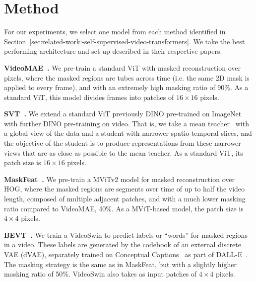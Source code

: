 \section{Method}
\label{sec:method}

For our experiments, we select one model from each method identified in Section~\ref{sec:related-work:-self-supervised-video-transformers}. We take the best performing architecture and set-up described in their respective papers.

{\bf VideoMAE~\cite{Tong2022VideoMAE}.} We pre-train a standard ViT with masked reconstruction over pixels, where the masked regions are tubes across time (i.e. the same 2D mask is applied to every frame), and with an extremely high masking ratio of 90\%. As a standard ViT, this model divides frames into patches of $16 \times 16$ pixels.

{\bf SVT~\cite{Ranasinghe2021SVT}.} We extend a standard ViT previously DINO pre-trained on ImageNet with further DINO pre-training on video. That is, we take a mean teacher~\cite{tarvainen2017mean} with a global view of the data and a student with narrower spatio-temporal slices, and the objective of the student is to produce representations from these narrower views that are as close as possible to the mean teacher. As a standard ViT, its patch size is $16 \times 16$ pixels.

{\bf MaskFeat~\cite{Wei2022MaskFeat}.} We pre-train a MViTv2 model for masked reconstruction over HOG, where the masked regions are segments over time of up to half the video length, composed of multiple adjacent patches, and with a much lower masking ratio compared to VideoMAE, 40\%. As a MViT-based model, the patch size is $4 \times 4$ pixels.

{\bf BEVT~\cite{Wang2021BEVT}.} We train a VideoSwin to predict labels or ``words'' for masked regions in a video. These labels are generated by the codebook of an external discrete VAE (dVAE), separately trained on Conceptual Captions~\cite{sharma2018conceptual} as part of DALL-E~\cite{ramesh2021zero}. The masking strategy is the same as in MaskFeat, but with a slightly higher masking ratio of 50\%. VideoSwin also takes as input patches of $4 \times 4$ pixels.